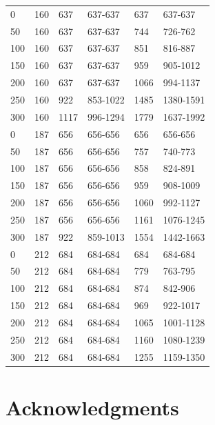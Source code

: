 \begin{table}[H]
{\begin{tabular}{@{\extracolsep{2 pt}}llllll@{}}
			\hline
			0 & 160 & 637 & 637-637 & 637 & 637-637 \\ 
			50 & 160 & 637 & 637-637 & 744 & 726-762 \\ 
			100 & 160 & 637 & 637-637 & 851 & 816-887 \\ 
			150 & 160 & 637 & 637-637 & 959 & 905-1012 \\ 
			200 & 160 & 637 & 637-637 & 1066 & 994-1137 \\ 
			250 & 160 & 922 & 853-1022 & 1485 & 1380-1591 \\ 
			300 & 160 & 1117 & 996-1294 & 1779 & 1637-1992 \\ 
			\hline
			0 & 187 & 656 & 656-656 & 656 & 656-656 \\ 
			50 & 187 & 656 & 656-656 & 757 & 740-773 \\ 
			100 & 187 & 656 & 656-656 & 858 & 824-891 \\ 
			150 & 187 & 656 & 656-656 & 959 & 908-1009 \\ 
			200 & 187 & 656 & 656-656 & 1060 & 992-1127 \\ 
			250 & 187 & 656 & 656-656 & 1161 & 1076-1245 \\ 
			300 & 187 & 922 & 859-1013 & 1554 & 1442-1663 \\ 
			\hline
			0 & 212 & 684 & 684-684 & 684 & 684-684 \\ 
			50 & 212 & 684 & 684-684 & 779 & 763-795 \\ 
			100 & 212 & 684 & 684-684 & 874 & 842-906 \\ 
			150 & 212 & 684 & 684-684 & 969 & 922-1017 \\ 
			200 & 212 & 684 & 684-684 & 1065 & 1001-1128 \\ 
			250 & 212 & 684 & 684-684 & 1160 & 1080-1239 \\ 
			300 & 212 & 684 & 684-684 & 1255 & 1159-1350 \\ 
			\hline
			
		\end{tabular}
	}
	\label{ap_b_p_sim_m_with_tds_0}
\end{table}





\section{Acknowledgments}

